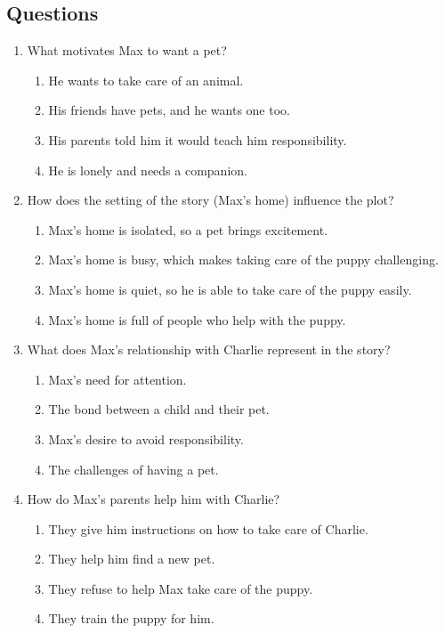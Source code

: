 \documentclass[12pt]{article}
\begin{document}
\subsection*{Questions}

\begin{enumerate}

    \item What motivates Max to want a pet?
    \begin{enumerate}[label=\Alph*.]
        \item He wants to take care of an animal.
        \item His friends have pets, and he wants one too.
        \item His parents told him it would teach him responsibility.
        \item He is lonely and needs a companion.
    \end{enumerate}
    \vspace{0.5cm}

    \item How does the setting of the story (Max’s home) influence the plot?
    \begin{enumerate}[label=\Alph*.]
        \item Max’s home is isolated, so a pet brings excitement.
        \item Max’s home is busy, which makes taking care of the puppy challenging.
        \item Max’s home is quiet, so he is able to take care of the puppy easily.
        \item Max’s home is full of people who help with the puppy.
    \end{enumerate}
    \vspace{0.5cm}

    \item What does Max's relationship with Charlie represent in the story?
    \begin{enumerate}[label=\Alph*.]
        \item Max's need for attention.
        \item The bond between a child and their pet.
        \item Max's desire to avoid responsibility.
        \item The challenges of having a pet.
    \end{enumerate}
    \vspace{0.5cm}

    \item How do Max's parents help him with Charlie?
    \begin{enumerate}[label=\Alph*.]
        \item They give him instructions on how to take care of Charlie.
        \item They help him find a new pet.
        \item They refuse to help Max take care of the puppy.
        \item They train the puppy for him.
    \end{enumerate}
    \vspace{0.5cm}


\end{enumerate}
\end{document}
